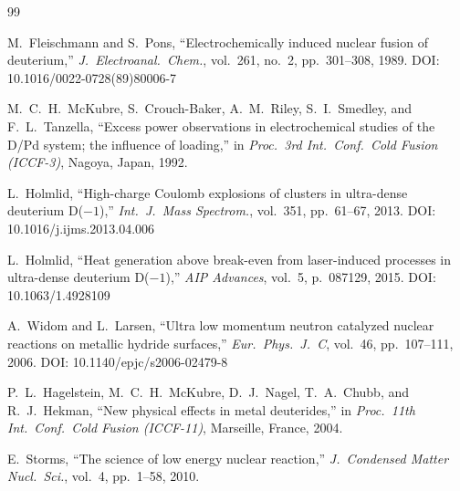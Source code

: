 \documentclass[11pt,a4paper]{article}
\begin{document}
\begin{thebibliography}{99}

M.~Fleischmann and S.~Pons,
``Electrochemically induced nuclear fusion of deuterium,''
\textit{J.\ Electroanal.\ Chem.}, vol.~261, no.~2, pp.~301--308, 1989.
\newblock DOI: 10.1016/0022-0728(89)80006-7

M.~C.~H.~McKubre, S.~Crouch-Baker, A.~M.~Riley, S.~I.~Smedley, and F.~L.~Tanzella,
``Excess power observations in electrochemical studies of the D/Pd system;
the influence of loading,''
in \textit{Proc.\ 3rd Int.\ Conf.\ Cold Fusion (ICCF-3)}, Nagoya, Japan, 1992.

L.~Holmlid,
``High-charge Coulomb explosions of clusters in ultra-dense deuterium D($-1$),''
\textit{Int.\ J.\ Mass Spectrom.}, vol.~351, pp.~61--67, 2013.
\newblock DOI: 10.1016/j.ijms.2013.04.006

L.~Holmlid,
``Heat generation above break-even from laser-induced processes in ultra-dense
deuterium D($-1$),''
\textit{AIP Advances}, vol.~5, p.~087129, 2015.
\newblock DOI: 10.1063/1.4928109

A.~Widom and L.~Larsen,
``Ultra low momentum neutron catalyzed nuclear reactions on metallic hydride
surfaces,''
\textit{Eur.\ Phys.\ J.\ C}, vol.~46, pp.~107--111, 2006.
\newblock DOI: 10.1140/epjc/s2006-02479-8

P.~L.~Hagelstein, M.~C.~H.~McKubre, D.~J.~Nagel, T.~A.~Chubb, and R.~J.~Hekman,
``New physical effects in metal deuterides,''
in \textit{Proc.\ 11th Int.\ Conf.\ Cold Fusion (ICCF-11)}, Marseille, France, 2004.

E.~Storms,
``The science of low energy nuclear reaction,''
\textit{J.\ Condensed Matter Nucl.\ Sci.}, vol.~4, pp.~1--58, 2010.

\end{thebibliography}
\end{document}
